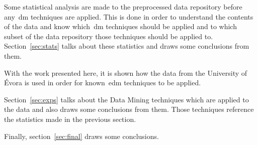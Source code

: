Some statistical analysis are made to the preprocessed data repository before
any~\gls{dm} techniques are applied. This is done in order to understand the
contents of the data and know which~\gls{dm} techniques should be applied and
to which subset of the data repository those techniques should be applied to.
Section~\ref{sec:stats} talks about these statistics and draws some conclusions
from them.

With the work presented here, it is shown how the data from the University of
Évora is used in order for known~\gls{edm} techniques to be applied.

Section~\ref{sec:exps} talks about the Data Mining techniques which are applied
to the data and also draws some conclusions from them. Those techniques
reference the statistics made in the previous section.

Finally, section~\ref{sec:final} draws some conclusions.
